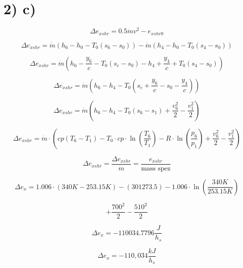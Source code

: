 \section*{2) c)}

\[
\Delta e_{xshr} = 0.5 \dot{m} v^2 - e_{xshr0}
\]

\[
\Delta e_{xshr} = \dot{m} (h_6 - h_0 - T_0 (s_6 - s_0)) - \dot{m} (h_4 - h_0 - T_0 (s_4 - s_0))
\]

\[
\Delta e_{xshr} = \dot{m} (h_6 - \frac{y_6}{c} - T_0 (s_c - s_0) - h_4 + \frac{y_4}{c} + T_0 (s_4 - s_0))
\]

\[
\Delta e_{xshr} = \dot{m} (h_6 - h_4 - T_0 (s_c + \frac{y_6}{c} - s_0 - \frac{y_4}{c}))
\]

\[
\Delta e_{xshr} = \dot{m} (h_6 - h_4 - T_0 (s_6 - s_1) + \frac{v_6^2}{2} - \frac{v_1^2}{2})
\]

\[
\Delta e_{xshr} = \dot{m} \cdot (cp (T_6 - T_1) - T_0 \cdot cp \cdot \ln \left( \frac{T_6}{T_1} \right) - R \cdot \ln \left( \frac{p_6}{p_1} \right) + \frac{v_6^2}{2} - \frac{v_1^2}{2})
\]

\[
\Delta e_{xshr} = \frac{\Delta e_{xshr}}{\dot{m}} = \frac{e_{xshr}}{\text{mass spez}}
\]

\[
\Delta e_x = 1.006 \cdot (340K - 253.15K) - (301273.5) - 1.006 \cdot \ln \left( \frac{340K}{253.15K} \right)
\]

\[
+ \frac{700^2}{2} - \frac{510^2}{2}
\]

\[
\Delta e_x = -110034.7796 \frac{J}{h_s}
\]

\[
\Delta e_x = -110,034 \frac{kJ}{h_s}
\]